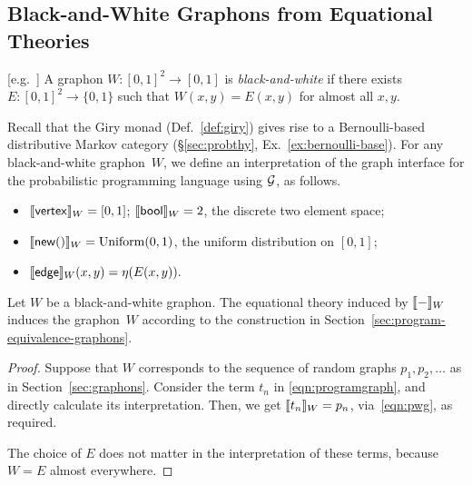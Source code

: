 \subsection{Black-and-White Graphons from Equational Theories}\label{sec:bw-theory}
\begin{definition}\label{def:bw}[e.g.~\cite{janson}]
  A graphon $W:[0,1]^2\to [0,1]$ is \emph{black-and-white} if there exists
$E:[0,1]^2\to \{0,1\}$ such that 
$W(x,y)=E(x,y)$ for almost all $x,y$.
\end{definition}
Recall that the Giry monad (Def.~\ref{def:giry}) gives rise to a Bernoulli-based distributive Markov category  (\S\ref{sec:probthy}, Ex.~\ref{ex:bernoulli-base}).
For any black-and-white graphon~$W$, we define an interpretation of
the graph interface for the probabilistic programming language
using $\mathcal{G}$, as follows.
\begin{itemize}
\item $\llbracket \mathsf{vertex}\rrbracket_W = [0,1]$; $\llbracket \mathsf{bool}\rrbracket_W= 2$, the discrete two element space;
\item $\llbracket \mathsf{new}()\rrbracket_W = \mathrm{Uniform}(0,1)$, the uniform distribution on $[0,1]$;
\item $\llbracket \mathsf{edge}\rrbracket_W(x,y)=\eta(E(x,y)).
        $
\end{itemize}
\begin{proposition}\label{prop:bw-ok}
  Let $W$ be a black-and-white graphon. The equational theory induced by $\llbracket -\rrbracket_W$ induces the graphon~$W$ according to the construction in Section~\ref{sec:program-equivalence-graphons}.
\end{proposition}
\begin{proof}
  

Suppose that $W$ corresponds to the sequence of random graphs $p_1,p_2,\dots $ as in Section~\ref{sec:graphons}. Consider the term $t_n$ in \eqref{eqn:programgraph}, and directly calculate its interpretation. Then, we get $\llbracket t_n\rrbracket_W=p_n$, via~\eqref{eqn:pwg}, as required. 

  The choice of $E$ does not matter in the interpretation of these terms, because $W=E$ almost everywhere.
\end{proof}
